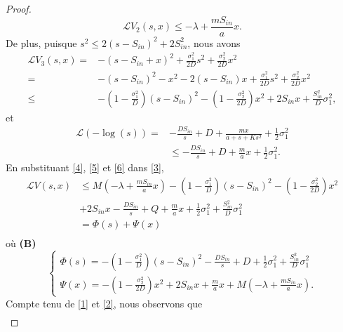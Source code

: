 \documentclass[12pt,a4paper]{report}%
\begin{document}
\begin{proof}
	\[
	\mathcal{L}V_2(s, x) \leq -\lambda + \frac{mS_{in}}{a} x.
	\]
	De plus, puisque \( s^2 \leq 2(s - S_{in})^2 + 2S_{in}^2 \), nous avons
	\begin{equation}\label{4}
		\begin{aligned}
			\mathcal{L} V_3(s, x)= & -\left(s-S_{in}+ x\right)^2+\frac{\sigma_1^2}{2 D} s^2+\frac{\sigma_2^2}{2 D} x^2 \\
			= & -\left( s-S_{in}\right)^2- x^2-2\left(s-S_{in}\right) x+\frac{\sigma_1^2}{2 D} s^2+\frac{\sigma_2^2}{2 D} x^2 \\
			\leq&-\left(1-\frac{\sigma_1^2}{D}\right)\left(s-S_{in}\right)^2-\left(1-\frac{\sigma_2^2}{2 D}\right) x^2+ 2S_{in} x+\frac{S_{in}^2}{D} \sigma_1^2,
		\end{aligned}
	\end{equation}
	et
	\begin{equation}\label{5}
		\begin{aligned}
			\mathcal{L}(-\log (s))= & -\frac{DS_{in}}{s}+D+ \frac{m x}{a+s+K s^2}+\frac{1}{2} \sigma_1^2 \\
			& \leq-\frac{D S_{in}}{s}+D+\frac{m}{a} x+\frac{1}{2} \sigma_1^2 .
		\end{aligned}
	\end{equation}
	En substituant \eqref{4}, \eqref{5} et \eqref{6} dans \eqref{3},
	$$
	\begin{aligned}
		\mathcal{L} V(s, x) &\leq M\left(-\lambda+\frac{m S_{in}}{a} x\right)-\left(1-\frac{\sigma_1^2}{D}\right)\left(s-S_{in}\right)^2-\left(1-\frac{\sigma_2^2}{2 D}\right) x^2 \\
		& +2 S_{in} x-\frac{D S_{in}}{s}+Q+\frac{m}{a} x+\frac{1}{2} \sigma_1^2+\frac{S_{in}^2}{D} \sigma_1^2 \\
		& =\Phi(s)+\Psi(x) \\
		&
	\end{aligned}
	$$
	où {\bf (B)}
	\begin{equation}\label{6}
		\left\{\begin{array}{l}
			\Phi(s)=-\left(1-\frac{\sigma_1^2}{D}\right)\left(s-S_{in}\right)^2-\frac{D S_{in}}{s}+D+\frac{1}{2} \sigma_1^2+\frac{S_{in}^2}{D} \sigma_1^2 \\
			\Psi(x)=-\left(1-\frac{\sigma_2^2}{2 D}\right) x^2+2 S_{in} x+\frac{m}{a} x+M\left(-\lambda+\frac{m S_{in}}{a} x\right) .
		\end{array}\right.
	\end{equation}
	Compte tenu de \eqref{1} et \eqref{2}, nous observons que
	$$
	\begin{aligned}

\end{aligned}$$
\end{proof}
\end{document}
